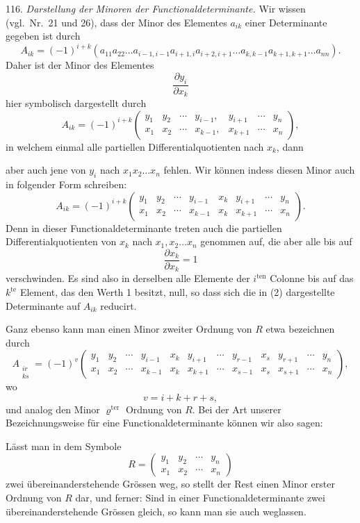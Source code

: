 \documentclass[11pt]{article}
\providecommand{\weberpage}[1]{}
\providecommand{\weq}[2]{\begin{equation}\tag{#1}#2\end{equation}}
\begin{document}
116. \textit{Darstellung der Minoren der Functionaldeterminante.} Wir wissen (vgl.\ Nr.\ 21 und 26), dass der Minor des Elementes $a_{ik}$ einer Determinante gegeben ist durch
\[
A_{ik}=(-1)^{i+k}(a_{11}a_{22}\ldots a_{i-1,i-1}a_{i+1,i}a_{i+2,i+1}\ldots a_{k,k-1}a_{k+1,k+1}\ldots a_{nn}).
\]
Daher ist der Minor des Elementes
\[
\frac{\partial y_i}{\partial x_k}
\]
hier symbolisch dargestellt durch
\weq{1}{A_{ik}=(-1)^{i+k}\begin{pmatrix} y_1 & y_2 & \cdots & y_{i-1}, & y_{i+1} & \cdots & y_n\\ x_1 & x_2 & \cdots & x_{k-1}, & x_{k+1} & \cdots & x_n \end{pmatrix},}
in welchem einmal alle partiellen Differentialquotienten nach $x_k$, dann


\weberpage{122}
aber auch jene von $y_i$ nach $x_1x_2\ldots x_n$ fehlen. Wir können indess diesen Minor auch in folgender Form schreiben:
\weq{2}{A_{ik}=(-1)^{i+k}\begin{pmatrix} y_1 & y_2 & \cdots & y_{i-1} & x_k & y_{i+1} & \cdots & y_n\\ x_1 & x_2 & \cdots & x_{k-1} & x_k & x_{k+1} & \cdots & x_n \end{pmatrix}.}
Denn in dieser Functionaldeterminante treten auch die partiellen Differentialquotienten von $x_k$ nach $x_1,x_2\ldots x_n$ genommen auf, die aber alle bis auf
\[
\frac{\partial x_k}{\partial x_k}=1
\]
verschwinden. Es sind also in derselben alle Elemente der $i^{\text{ten}}$ Colonne bis auf das $k^{\text{te}}$ Element, das den Werth 1 besitzt, null, so dass sich die in (2) dargestellte Determinante auf $A_{ik}$ reducirt.

Ganz ebenso kann man einen Minor zweiter Ordnung von $R$ etwa bezeichnen durch
\[
A_{\substack{ir\\ks}}=(-1)^v\begin{pmatrix} y_1 & y_2 & \cdots & y_{i-1} & x_k & y_{i+1} & \cdots & y_{r-1} & x_s & y_{r+1} & \cdots & y_n\\ x_1 & x_2 & \cdots & x_{k-1} & x_k & x_{k+1} & \cdots & x_{s-1} & x_s & x_{s+1} & \cdots & x_n \end{pmatrix},
\]
wo
\[
v=i+k+r+s,
\]
und analog den Minor $\varrho^{\text{ter}}$ Ordnung von $R$. Bei der Art unserer Bezeichnungsweise für eine Functionaldeterminante können wir also sagen:

\glqq Lässt man in dem Symbole
\[
R=\begin{pmatrix} y_1 & y_2 & \cdots & y_n\\ x_1 & x_2 & \cdots & x_n \end{pmatrix}
\]
zwei übereinanderstehende Grössen weg, so stellt der Rest einen Minor erster Ordnung von $R$ dar, und ferner: Sind in einer Functionaldeterminante zwei übereinanderstehende Grössen gleich, so kann man sie auch weglassen.\grqq{}
\end{document}

